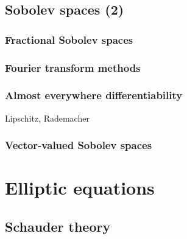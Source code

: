 \documentclass{../note}
\begin{document}
\chapter{Sobolev spaces (2)}
\section{Fractional Sobolev spaces}

\section{Fourier transform methods}

\section{Almost everywhere differentiability}
Lipschitz, Rademacher

\section{Vector-valued Sobolev spaces}





\part{Elliptic equations}
\chapter{Schauder theory}
\end{document}
